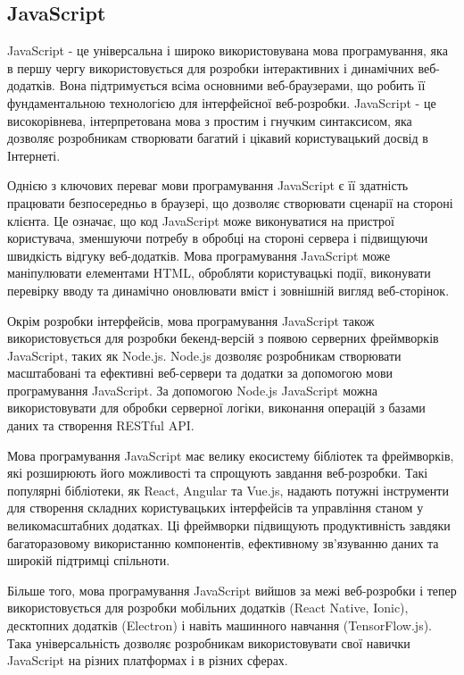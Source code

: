 \subsection{JavaScript}
\label{subsec:js-subsection}

JavaScript - це універсальна і широко використовувана мова програмування, яка в першу чергу використовується для розробки інтерактивних і динамічних веб-додатків. Вона підтримується всіма основними веб-браузерами, що робить її фундаментальною технологією для інтерфейсної веб-розробки. JavaScript - це високорівнева, інтерпретована мова з простим і гнучким синтаксисом, яка дозволяє розробникам створювати багатий і цікавий користувацький досвід в Інтернеті.

Однією з ключових переваг мови програмування JavaScript є її здатність працювати безпосередньо в браузері, що дозволяє створювати сценарії на стороні клієнта. Це означає, що код JavaScript може виконуватися на пристрої користувача, зменшуючи потребу в обробці на стороні сервера і підвищуючи швидкість відгуку веб-додатків. Мова програмування JavaScript може маніпулювати елементами HTML, обробляти користувацькі події, виконувати перевірку вводу та динамічно оновлювати вміст і зовнішній вигляд веб-сторінок.

Окрім розробки інтерфейсів, мова програмування JavaScript також використовується для розробки бекенд-версій з появою серверних фреймворків JavaScript, таких як Node.js. Node.js дозволяє розробникам створювати масштабовані та ефективні веб-сервери та додатки за допомогою мови програмування JavaScript. За допомогою Node.js JavaScript можна використовувати для обробки серверної логіки, виконання операцій з базами даних та створення RESTful API.

Мова програмування JavaScript має велику екосистему бібліотек та фреймворків, які розширюють його можливості та спрощують завдання веб-розробки. Такі популярні бібліотеки, як React, Angular та Vue.js, надають потужні інструменти для створення складних користувацьких інтерфейсів та управління станом у великомасштабних додатках. Ці фреймворки підвищують продуктивність завдяки багаторазовому використанню компонентів, ефективному зв'язуванню даних та широкій підтримці спільноти.

Більше того, мова програмування JavaScript вийшов за межі веб-розробки і тепер використовується для розробки мобільних додатків (React Native, Ionic), десктопних додатків (Electron) і навіть машинного навчання (TensorFlow.js). Така універсальність дозволяє розробникам використовувати свої навички JavaScript на різних платформах і в різних сферах.

